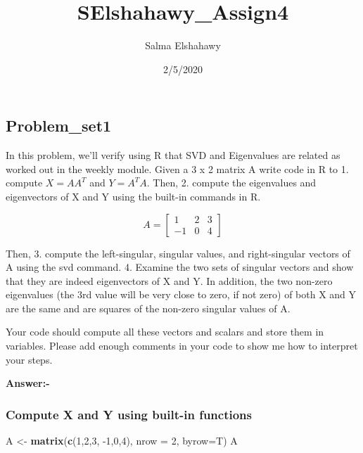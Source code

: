 \documentclass[]{article}
\title{SElshahawy\_Assign4}
\author{Salma Elshahawy}
\date{2/5/2020}
\newenvironment{Shaded}{\begin{snugshade}}{\end{snugshade}}
\newcommand{\DataTypeTok}[1]{\textcolor[rgb]{0.13,0.29,0.53}{#1}}
\newcommand{\DecValTok}[1]{\textcolor[rgb]{0.00,0.00,0.81}{#1}}
\newcommand{\KeywordTok}[1]{\textcolor[rgb]{0.13,0.29,0.53}{\textbf{#1}}}
\newcommand{\NormalTok}[1]{#1}
\newcommand{\StringTok}[1]{\textcolor[rgb]{0.31,0.60,0.02}{#1}}
\begin{document}
\maketitle

\hypertarget{problem_set1}{%
\subsection{Problem\_set1}\label{problem_set1}}

In this problem, we'll verify using R that SVD and Eigenvalues are
related as worked out in the weekly module. Given a 3 x 2 matrix A write
code in R to 1. compute \(X = AA^T\) and \(Y = A^TA\). Then, 2. compute
the eigenvalues and eigenvectors of X and Y using the built-in commands
in R.

\[A=\begin{bmatrix}1&2&3\\-1&0&4\end{bmatrix}\]

Then, 3. compute the left-singular, singular values, and right-singular
vectors of A using the svd command. 4. Examine the two sets of singular
vectors and show that they are indeed eigenvectors of X and Y. In
addition, the two non-zero eigenvalues (the 3rd value will be very close
to zero, if not zero) of both X and Y are the same and are squares of
the non-zero singular values of A.

Your code should compute all these vectors and scalars and store them in
variables. Please add enough comments in your code to show me how to
interpret your steps.

\textbf{Answer:-}

\hypertarget{compute-x-and-y-using-built-in-functions}{%
\subsubsection{Compute X and Y using built-in
functions}\label{compute-x-and-y-using-built-in-functions}}

\begin{Shaded}
\begin{Highlighting}[]
\NormalTok{A <-}\StringTok{ }\KeywordTok{matrix}\NormalTok{(}\KeywordTok{c}\NormalTok{(}\DecValTok{1}\NormalTok{,}\DecValTok{2}\NormalTok{,}\DecValTok{3}\NormalTok{,}
              \DecValTok{-1}\NormalTok{,}\DecValTok{0}\NormalTok{,}\DecValTok{4}\NormalTok{), }\DataTypeTok{nrow =} \DecValTok{2}\NormalTok{, }\DataTypeTok{byrow=}\NormalTok{T)}
\NormalTok{A}
\end{Highlighting}
\end{Shaded}
\end{document}
